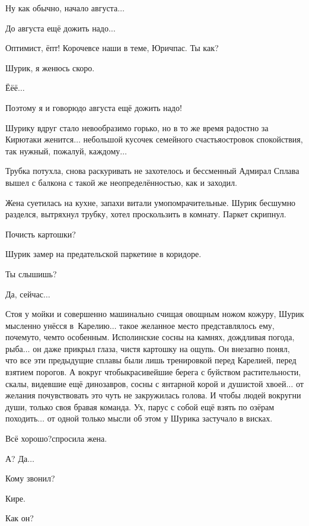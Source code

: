 \diagdash Ну как обычно, начало августа$\ldots$

\diagdash До августа ещё дожить надо$\ldots$

\diagdash Оптимист, ёпт! Короче\mdash все наши в теме, Юрич\mdash пас. Ты как?

\diagdash Шурик, я женюсь скоро.

\diagdash Ё\sdash ё\sdash ё$\ldots$

\diagdash Поэтому я и говорю\mdash до августа ещё дожить надо!

Шурику вдруг стало невообразимо горько, но в то же время радостно за Кирю\mdash таки женится$\ldots$ небольшой кусочек семейного счастья\mdash островок спокойствия, так нужный, пожалуй, каждому$\ldots$ 

Трубка потухла, снова раскуривать не захотелось и бессменный Адмирал Сплава вышел с балкона с такой же неопределённостью, как и заходил.

Жена суетилась на кухне, запахи витали умопомрачительные. Шурик бесшумно разделся, вытряхнул трубку, хотел проскользить в комнату. Паркет скрипнул. 

\diagdash Почисть картошки?

Шурик замер на предательской паркетине в коридоре.

\diagdash Ты слышишь?

\diagdash Да, сейчас$\ldots$

Стоя у мойки и совершенно машинально счищая овощным ножом кожуру, Шурик мысленно унёсся в~Карелию$\ldots$ такое желанное место представлялось ему, почему\sdash то, чем\sdash то особенным. Исполинские сосны на камнях, дождливая погода, рыба$\ldots$ он даже прикрыл глаза, чистя картошку на ощупь. Он внезапно понял, что все эти предыдущие сплавы были лишь тренировкой перед Карелией, перед взятием порогов. А вокруг чтобы\mdash красивейшие берега с буйством растительности, скалы, видевшие ещё динозавров, сосны с янтарной корой и душистой хвоей$\ldots$ от желания почувствовать это чуть не закружилась голова. И чтобы людей вокруг\mdash ни души, только своя бравая команда. Ух, парус с собой ещё взять по озёрам походить$\ldots$ от одной только мысли об этом у Шурика застучало в висках.

\diagdash Всё хорошо?\mdash спросила жена.

\diagdash А? Да$\ldots$

\diagdash Кому звонил?

\diagdash Кире.

\diagdash Как он? 

